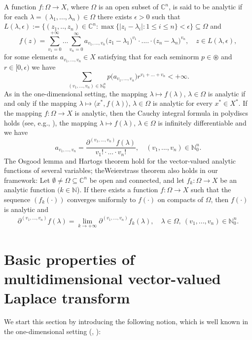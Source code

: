 \documentclass{amsart}
\theoremstyle{definition}
\theoremstyle{remark}
\numberwithin{equation}{section}
\begin{document}
A function $f\colon\Omega\to X$, where $\Omega$ is an open subset of ${\mathbb C}^{n}$, is said to be analytic if for each $\lambda=(\lambda_{1},...,\lambda_{n}) \in \Omega$ there exists $\epsilon>0$ such that $L(\lambda,\epsilon):=\{(z_{1},..,z_{n})\in {\mathbb C}^{n} : \max\{ |z_{i}-\lambda_{i}| : 1\leq i\leq n\}<\epsilon \}\subseteq \Omega$  
and
$$
f(z)=\sum_{v_{1}=0}^{+\infty}...\sum_{v_{n}=0}^{\infty}a_{v_{1},...,v_{n}}\bigl( z_{1}-\lambda_{1} \bigr)^{v_{1}}\cdot .... \cdot \bigl( z_{n}-\lambda_{n} \bigr)^{v_{n}},\quad z\in L(\lambda,\epsilon),
$$
for some elements $a_{v_{1},...,v_{n}}\in X$ satisfying that for each seminorm $p\in \circledast$ and $r\in [0,\epsilon)$ we have
$$
\sum_{(v_{1},...,v_{n})\in {\mathbb N}_{0}^{n}}p\bigl(a_{v_{1},...,v_{n}} \bigr) r^{v_{1}+...+v_{n}}<+\infty .
$$ 
As in the one-dimensional setting, the mapping $\lambda\mapsto f(\lambda)$, $\lambda\in\Omega$ is analytic if and only if the mapping $\lambda\mapsto\langle x^*,f(\lambda)\rangle$, $\lambda\in\Omega$ is analytic for every $x^*\in X^*$.
If the mapping $f\colon\Omega\to X$ is analytic, then the Cauchy integral formula in polydiscs holds (see, e.g., \cite[Theorem 5.1, Theorem 5.7]{kruse}), the mapping $\lambda\mapsto f(\lambda)$, $\lambda\in\Omega$ is infinitely differentiable and we have
$$
a_{v_{1},...,v_{n}}=\frac{\partial^{(v_{1},...,v_{n})}f(\lambda)}{v_{1}!\cdot ... \cdot v_{n}!},\quad (v_{1},...,v_{n})\in {\mathbb N}_{0}^{n}.
$$  
The Osgood lemma and Hartogs theorem hold for the vector-valued analytic functions of several variables; theWeierstrass theorem also holds in our framework:   
Let $\emptyset\neq\Omega\subseteq\mathbb C^{n}$ be open and connected, and let $f_k\colon\Omega\to X$ be an analytic function $(k\in\mathbb N$). If there exists a function $f\colon\Omega\to X$ such that the sequence $(f_{k}(\cdot))$ converges uniformly to $f(\cdot)$ on compacts of $\Omega$, then $f(\cdot)$ is analytic and 
\begin{align}\label{osgud}
\partial^{(v_{1},...,v_{n})}f(\lambda)=\lim_{k\rightarrow +\infty}\partial^{(v_{1},...,v_{n})}f_{k}(\lambda),\quad \lambda \in \Omega,\ (v_{1},...,v_{n})\in {\mathbb N}_{0}^{n}.
\end{align}

\section{Basic properties of multidimensional vector-valued Laplace transform}\label{sdf}

We start this section by introducing the following notion, which is well known in the one-dimensional setting (\cite{a43}, \cite{FKP}):
\end{document}
